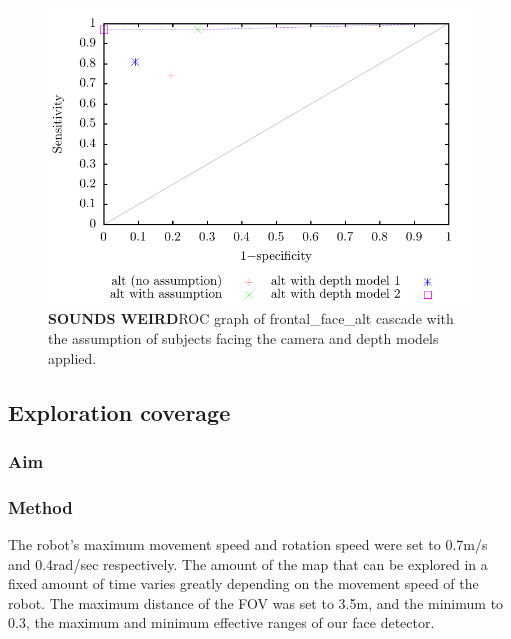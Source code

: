 \documentclass[conference]{IEEEtran}
\begin{document}
\begin{figure}
  \includegraphics[width=\columnwidth]{kinect_ROC}
  \caption{\textbf{SOUNDS WEIRD}ROC graph of frontal\_face\_alt cascade with the assumption of subjects facing the camera and depth models applied.}
  \label{fig:cascade_with_model}
\end{figure}
\subsection{Exploration coverage}
\subsubsection{Aim}
\subsubsection{Method}
The robot's maximum movement speed and rotation speed were set to 0.7m/s and 0.4rad/sec respectively. The amount of the map that can be explored in a fixed amount of time varies greatly depending on the movement speed of the robot. The maximum distance of the FOV was set to 3.5m, and the minimum to 0.3, the maximum and minimum effective ranges of our face detector.
\end{document}
